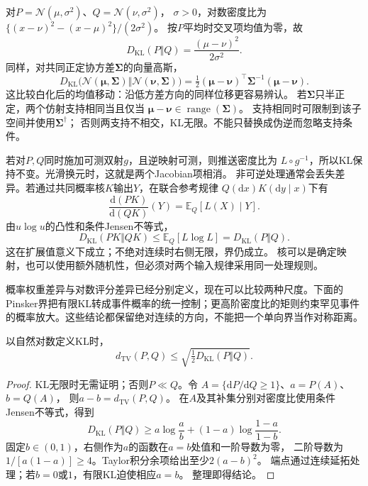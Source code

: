 对\(P=\mathcal N(\mu,\sigma^2)\)、\(Q=\mathcal N(\nu,\sigma^2)\)，
\(\sigma>0\)，对数密度比为
\(\{(x-\nu)^2-(x-\mu)^2\}/(2\sigma^2)\)。
按\(P\)平均时交叉项均值为零，故
\begin{equation}
  D_{\mathrm{KL}}(P\Vert Q)=\frac{(\mu-\nu)^2}{2\sigma^2}.
  \label{eq:information-gaussian-location-kl}
\end{equation}
同样，对共同正定协方差\(\bm\Sigma\)的向量高斯，
\begin{equation}
  D_{\mathrm{KL}}\bigl(
    \mathcal N(\bm\mu,\bm\Sigma)\Vert\mathcal N(\bm\nu,\bm\Sigma)\bigr)
  =\tfrac12(\bm\mu-\bm\nu)^\top\bm\Sigma^{-1}(\bm\mu-\bm\nu).
  \label{eq:information-vector-gaussian-translation-kl}
\end{equation}
这比较白化后的均值移动：沿低方差方向的同样位移更容易辨认。
若\(\bm\Sigma\)只半正定，两个仿射支持相同当且仅当
\(\bm\mu-\bm\nu\in\operatorname{range}(\bm\Sigma)\)。
支持相同时可限制到该子空间并使用\(\bm\Sigma^\dagger\)；
否则两支持不相交，KL无限。不能只替换成伪逆而忽略支持条件。

若对\(P,Q\)同时施加可测双射\(g\)，且逆映射可测，则推送密度比为
\(L\circ g^{-1}\)，所以KL保持不变。光滑换元时，这就是两个Jacobian项相消。
非可逆处理通常会丢失差异。若通过共同概率核\(K\)输出\(Y\)，在联合参考规律
\(Q(\mathrm dx)K(\mathrm dy\mid x)\)下有
\[
  \frac{\mathrm d(PK)}{\mathrm d(QK)}(Y)=\mathbb E_Q[L(X)\mid Y].
\]
由\(u\log u\)的凸性和条件Jensen不等式，
\[
  D_{\mathrm{KL}}(PK\Vert QK)
  \leq\mathbb E_Q[L\log L]=D_{\mathrm{KL}}(P\Vert Q).
\]
这在扩展值意义下成立；不绝对连续时右侧无限，界仍成立。
核可以是确定映射，也可以使用额外随机性，但必须对两个输入规律采用同一处理规则。

\par\medskip
概率权重差异与对数评分差异已经分别定义，现在可以比较两种尺度。下面的Pinsker界把有限KL转成事件概率的统一控制；更高阶密度比的矩则约束罕见事件的概率放大。这些结论都保留绝对连续的方向，不能把一个单向界当作对称距离。

\begin{theorem}[Pinsker不等式]
\label{thm:information-pinsker}
以自然对数定义KL时，
\begin{equation}
  d_{\mathrm{TV}}(P,Q)\leq
  \sqrt{\tfrac12D_{\mathrm{KL}}(P\Vert Q)}.
  \label{eq:information-pinsker}
\end{equation}
\end{theorem}
\begin{proof}
KL无限时无需证明；否则\(P\ll Q\)。令
\(A=\{\mathrm dP/\mathrm dQ\geq1\}\)、\(a=P(A)\)、\(b=Q(A)\)，
则\(a-b=d_{\mathrm{TV}}(P,Q)\)。
在\(A\)及其补集分别对密度比使用条件Jensen不等式，得到
\[
  D_{\mathrm{KL}}(P\Vert Q)\geq
  a\log\frac ab+(1-a)\log\frac{1-a}{1-b}.
\]
固定\(b\in(0,1)\)，右侧作为\(a\)的函数在\(a=b\)处值和一阶导数为零，
二阶导数为\(1/[a(1-a)]\geq4\)。Taylor积分余项给出至少\(2(a-b)^2\)。
端点通过连续延拓处理；若\(b=0\)或\(1\)，有限KL迫使相应\(a=b\)。
整理即得结论。
\end{proof}


